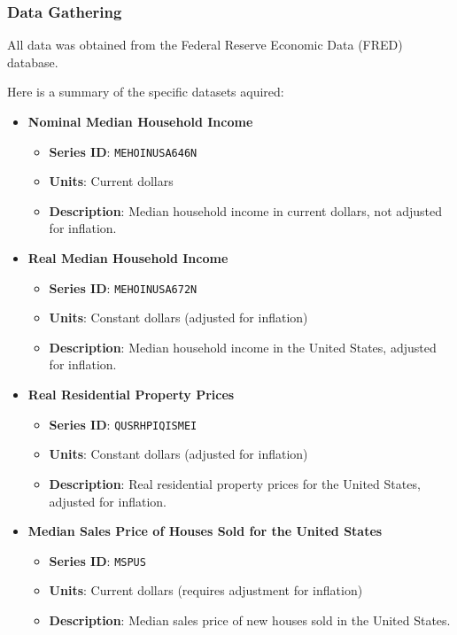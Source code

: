 \documentclass{article}
\begin{document}
\subsubsection{Data Gathering}

All data was obtained from the Federal Reserve Economic Data (FRED) database. 

Here is a summary of the specific datasets aquired:

\begin{itemize} 
  \item \textbf{Nominal Median Household Income} 
    
    \begin{itemize} 
      \item \textbf{Series ID}: \texttt{MEHOINUSA646N} 
      \item \textbf{Units}: Current dollars 
      \item \textbf{Description}: Median household income in current dollars, not adjusted for inflation. 
    \end{itemize}

    \item \textbf{Real Median Household Income}
    \begin{itemize}
        \item \textbf{Series ID}: \texttt{MEHOINUSA672N}
        \item \textbf{Units}: Constant dollars (adjusted for inflation)
        \item \textbf{Description}: Median household income in the United States, adjusted for inflation.
    \end{itemize}

    \item \textbf{Real Residential Property Prices}
    \begin{itemize}
        \item \textbf{Series ID}: \texttt{QUSRHPIQISMEI}
        \item \textbf{Units}: Constant dollars (adjusted for inflation)
        \item \textbf{Description}: Real residential property prices for the United States, adjusted for inflation.
    \end{itemize}
    
    \item \textbf{Median Sales Price of Houses Sold for the United States}
    \begin{itemize}
        \item \textbf{Series ID}: \texttt{MSPUS}
        \item \textbf{Units}: Current dollars (requires adjustment for inflation)
        \item \textbf{Description}: Median sales price of new houses sold in the United States.
    \end{itemize}
    

\end{itemize}
\end{document}
